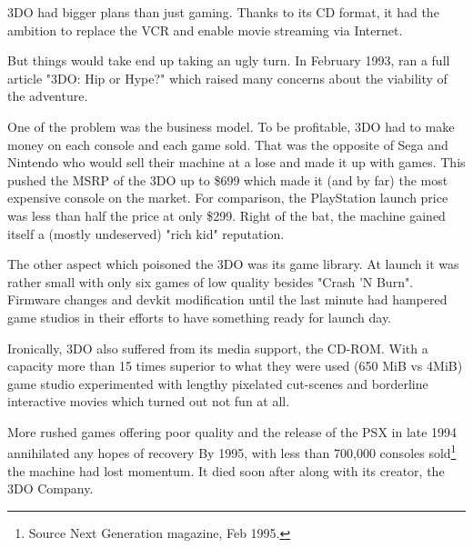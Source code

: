 \par
 3DO had bigger plans than just gaming. Thanks to its CD format, it had the ambition to replace the VCR and enable movie streaming via Internet.\\
\par
But things would take end up taking an ugly turn. In February 1993,  ran a full article "3DO: Hip or Hype?" which raised many concerns about the viability of the adventure.\\
\par
One of the problem was the business model. To be profitable, 3DO had to make money on each console and each game sold. That was the opposite of Sega and Nintendo who would sell their machine at a lose and made it up with games. This pushed the MSRP of the 3DO up to \$699 which made it (and by far) the most expensive console on the market. For comparison, the PlayStation launch price was less than half the price at only \$299. Right of the bat, the machine gained itself a (mostly undeserved) "rich kid" reputation.\\
\par
The other aspect which poisoned the 3DO was its game library. At launch it was rather small with only six games of low quality besides "Crash 'N Burn". Firmware changes and devkit modification until the last minute had hampered game studios in their efforts to have something ready for launch day.\\
\par
Ironically, 3DO also suffered from its media support, the CD-ROM. With a capacity more than 15 times superior to what they were used (650 MiB vs 4MiB) game studio experimented with lengthy pixelated cut-scenes and borderline interactive movies which turned out not fun at all.\\
\par
More rushed games offering poor quality and the release of the PSX in late 1994 annihilated any hopes of recovery
By 1995, with less than 700,000 consoles sold\footnote{Source Next Generation magazine, Feb 1995.} the machine had lost momentum. It died soon after along with its creator, the 3DO Company.






